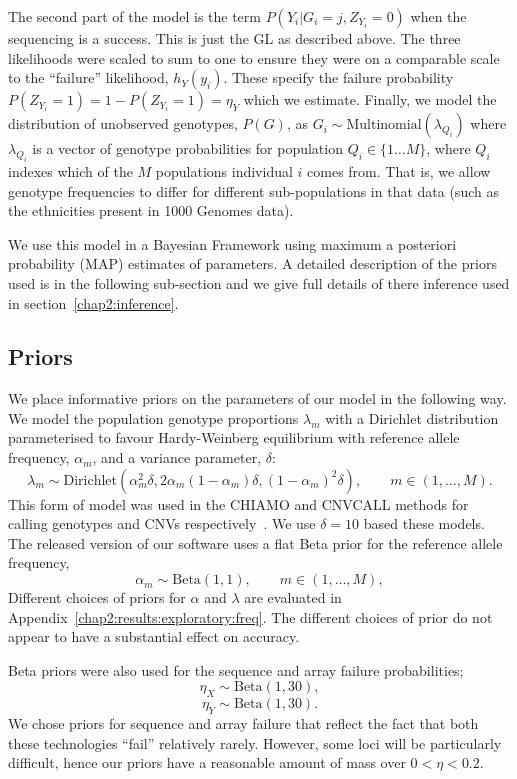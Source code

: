The second part of the model is the term $P(Y_i|G_i=j,Z_{Y_i}=0)$ when the sequencing is a success. This is just the GL as described above. The three likelihoods were scaled to sum to one to ensure they were on a comparable scale to the ``failure'' likelihood, $h_Y(y_i)$. These specify the failure probability $P(Z_{Y_i}=1) = 1 - P(Z_{Y_i}=1) = \eta_Y$ which we estimate. Finally, we model the distribution of unobserved genotypes, $P(G)$, as $G_{i} \sim \textrm{Multinomial}(\lambda_{Q_i})$ where $\lambda_{Q_i}$ is a vector of genotype probabilities for population $Q_i \in \{1 \ldots  M\}$, where $Q_i$ indexes which of the $M$ populations individual $i$ comes from.  That is, we allow genotype frequencies to differ for different sub-populations in that data (such as the ethnicities present in 1000 Genomes data).

We use this model in a Bayesian Framework using maximum a posteriori probability (MAP) estimates of parameters.  A detailed description of the priors used is in the following sub-section and we give full details of there inference used in section~\ref{chap2:inference}.


\subsection{Priors}
\label{chap2:priors}
We place informative priors on the parameters of our model in the following way. We model the population genotype proportions $\lambda_m$ with a Dirichlet distribution parameterised to favour Hardy-Weinberg equilibrium with reference allele frequency, $\alpha_m$, and a variance parameter, $\delta$:
\begin{equation}
\lambda_m \sim \textrm{Dirichlet}(\alpha_m^2\delta,2\alpha_m(1-\alpha_m)\delta,(1-\alpha_m)^2\delta),  \qquad m \in (1,\ldots,M).
\end{equation}
This form of model was used in the CHIAMO and CNVCALL methods for calling genotypes and CNVs respectively~\citep{consortium2007,craddock2010genome, cardin2011bayesian}. We use $\delta=10$ based these models. The released version of our software uses a flat Beta prior for the reference allele frequency,$$\alpha_m \sim \textrm{Beta}(1,1),  \qquad m \in (1,\ldots,M),$$
Different choices of priors for $\alpha$ and $\lambda$ are evaluated in Appendix~\ref{chap2:results:exploratory:freq}. The different choices of prior do not appear to have a substantial effect on accuracy. 

Beta priors were also used for the sequence and array failure probabilities;
$$\eta_X \sim \textrm{Beta}(1,30),$$
$$\eta_Y \sim \textrm{Beta}(1,30).$$
We chose priors for sequence and array failure that reflect the fact that both these technologies ``fail'' relatively rarely.  However, some loci will be particularly difficult, hence our priors have a reasonable amount of mass over $0 < \eta < 0.2$.   


